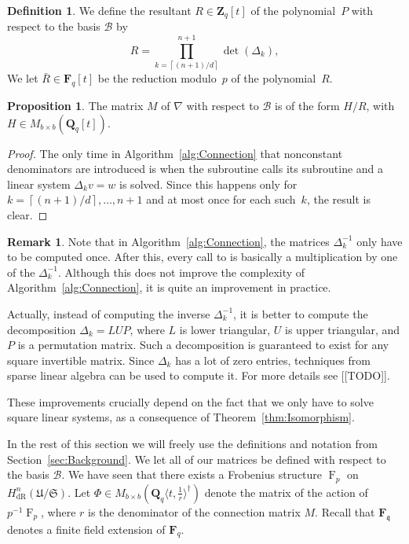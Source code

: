 \documentclass[a4paper,11pt]{article}
\numberwithin{equation}{section}
\providecommand{\ceil}[1]{\left\lceil#1\right\rceil}   %
\newcommand{\ZZ}{\mathbf{Z}} %
\newcommand{\QQ}{\mathbf{Q}} %
\newcommand{\FF}{\mathbf{F}} %
\DeclareMathOperator{\Frob}{F}           %
\providecommand{\HdR}{H_{\text{dR}}}    %
\providecommand{\cB}{\mathcal{B}} %
\theoremstyle{definition}
\newtheorem{prop}[thm]{Proposition}
\newtheorem{defn}[thm]{Definition}
\newtheorem{rem}[thm]{Remark}
\begin{document}
\begin{defn} \label{defn:resultant}
We define the resultant $R \in \ZZ_q[t]$ of the polynomial~$P$ with 
respect to the basis $\cB$ by
\[
R = \prod_{k=\ceil{(n+1)/d}}^{n+1}  \det(\Delta_k),
\]
We let $\bar{R} \in \FF_q[t]$ be the 
reduction modulo~$p$ of the polynomial~$R$.
\end{defn}

\begin{prop} \label{thm:denom}
The matrix $M$ of $\nabla$ with respect to $\cB$ is of the form
$H/R$, with $H \in M_{b \times b}(\QQ_q[t])$.
\end{prop}

\begin{proof}
The only time in Algorithm~\ref{alg:Connection} that nonconstant denominators 
are introduced is when the subroutine {} calls its subroutine 
{} and a linear system $\Delta_k v = w$ is solved. Since this 
happens only for $k=\ceil{(n+1)/d}, \dotsc, n+1$ and at most once for each 
such~$k$, the result is clear.
\end{proof}

\begin{rem} 
Note that in Algorithm~\ref{alg:Connection}, the matrices $\Delta_k^{-1}$ 
only have to be computed once. After this, every call to {} 
is basically a multiplication by one of the $\Delta_k^{-1}$.  Although this 
does not improve the complexity of Algorithm~\ref{alg:Connection}, it is 
quite an improvement in practice. 

Actually, instead of computing the inverse $\Delta_k^{-1}$, it is better 
to compute the decomposition $\Delta_k = L U P$, where $L$ is lower triangular, 
$U$ is upper triangular, and $P$ is a permutation matrix. Such a decomposition 
is guaranteed to exist for any square invertible matrix. Since $\Delta_k$ has 
a lot of zero entries, techniques from sparse linear algebra can be used to 
compute it. For more details see [[TODO]].


These improvements crucially depend on the fact that we only have to solve 
square linear systems, as a consequence of Theorem~\ref{thm:Isomorphism}.
\end{rem}

In the rest of this section we will freely use the definitions and notation 
from Section~\ref{sec:Background}. We let all of our matrices be defined with 
respect to the basis $\cB$. We have seen that there exists a Frobenius 
structure $\Frob_p$ on $\HdR^n(\mathfrak{U}/\mathfrak{S})$. Let 
$\Phi \in M_{b \times b}(\QQ_q \langle t, \frac{1}{r} \rangle^{\dag})$ 
denote the matrix of the action of $p^{-1}\Frob_p$, where $r$ is the 
denominator of the connection matrix $M$. Recall that $\FF_{\mathfrak{q}}$ 
denotes a finite field extension of $\FF_q$. 
\end{document}

